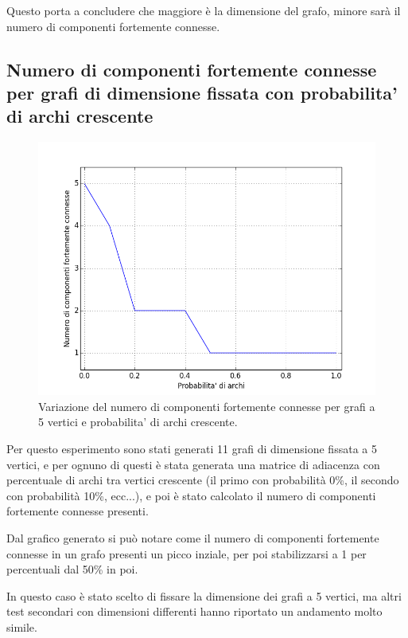 \documentclass[a4paper,12pt]{article}
\begin{document}
Questo porta a concludere che maggiore è la dimensione del grafo, minore sarà il numero di componenti fortemente connesse.

\clearpage
\subsection{Numero di componenti fortemente connesse per grafi di dimensione fissata con probabilita' di archi crescente}
\begin{figure}[h]
    \centering
    \captionsetup{justification=centering,margin=1cm}
    \includegraphics[width=1.0\textwidth]{test2}
    \caption{Variazione del numero di componenti fortemente connesse per grafi a 5 vertici e probabilita' di archi crescente.}
    \label{fig:test2}
\end{figure}

Per questo esperimento sono stati generati 11 grafi di dimensione fissata a 5 vertici, e per ognuno di questi è stata generata una matrice di adiacenza con percentuale di archi tra vertici crescente (il primo con probabilità 0\%, il secondo con probabilità 10\%, ecc...), e poi è stato calcolato il numero di componenti fortemente connesse presenti.
\newline

Dal grafico generato si può notare come il numero di componenti fortemente connesse in un grafo presenti un picco inziale, per poi stabilizzarsi a 1 per percentuali dal 50\% in poi.
\newline

In questo caso è stato scelto di fissare la dimensione dei grafi a 5 vertici, ma altri test secondari con dimensioni differenti hanno riportato un andamento molto simile.
\newline
\end{document}
